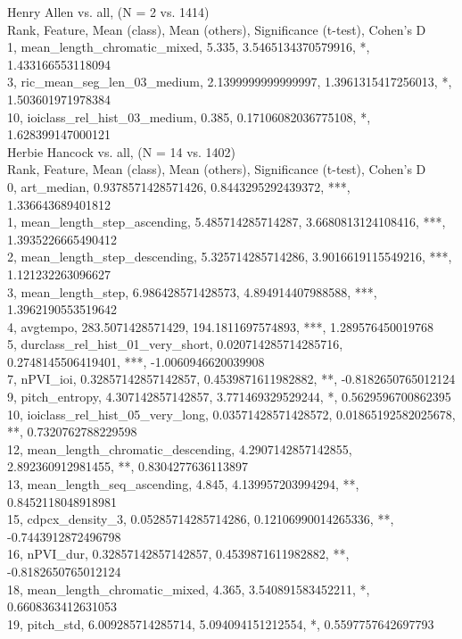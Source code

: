 Henry Allen vs. all, (N = 2 vs. 1414)\\
Rank, Feature, Mean (class), Mean (others), Significance (t-test), Cohen's D\\
1, mean_length_chromatic_mixed, 5.335, 3.5465134370579916, *, 1.433166553118094\\
3, ric_mean_seg_len_03_medium, 2.1399999999999997, 1.3961315417256013, *, 1.503601971978384\\
10, ioiclass_rel_hist_03_medium, 0.385, 0.17106082036775108, *, 1.628399147000121\\
Herbie Hancock vs. all, (N = 14 vs. 1402)\\
Rank, Feature, Mean (class), Mean (others), Significance (t-test), Cohen's D\\
0, art_median, 0.9378571428571426, 0.8443295292439372, ***, 1.336643689401812\\
1, mean_length_step_ascending, 5.485714285714287, 3.6680813124108416, ***, 1.3935226665490412\\
2, mean_length_step_descending, 5.325714285714286, 3.9016619115549216, ***, 1.121232263096627\\
3, mean_length_step, 6.986428571428573, 4.894914407988588, ***, 1.3962190553519642\\
4, avgtempo, 283.5071428571429, 194.1811697574893, ***, 1.289576450019768\\
5, durclass_rel_hist_01_very_short, 0.020714285714285716, 0.2748145506419401, ***, -1.0060946620039908\\
7, nPVI_ioi, 0.32857142857142857, 0.4539871611982882, **, -0.8182650765012124\\
9, pitch_entropy, 4.307142857142857, 3.771469329529244, *, 0.5629596700862395\\
10, ioiclass_rel_hist_05_very_long, 0.03571428571428572, 0.01865192582025678, **, 0.7320762788229598\\
12, mean_length_chromatic_descending, 4.2907142857142855, 2.892360912981455, **, 0.8304277636113897\\
13, mean_length_seq_ascending, 4.845, 4.139957203994294, **, 0.8452118048918981\\
15, cdpcx_density_3, 0.05285714285714286, 0.12106990014265336, **, -0.7443912872496798\\
16, nPVI_dur, 0.32857142857142857, 0.4539871611982882, **, -0.8182650765012124\\
18, mean_length_chromatic_mixed, 4.365, 3.540891583452211, *, 0.6608363412631053\\
19, pitch_std, 6.009285714285714, 5.094094151212554, *, 0.5597757642697793\\
